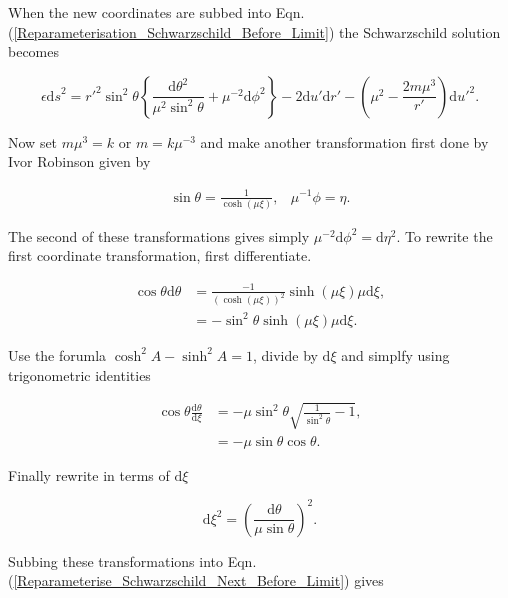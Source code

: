 \noindent When the new coordinates are subbed into Eqn.(\ref{Reparameterisation_Schwarzschild_Before_Limit}) the Schwarzschild solution becomes

\begin{equation}\label{Reparameterise_Schwarzschild_Next_Before_Limit}
\epsilon {\mathrm{d}s}^2 = {r'}^2 \sin^2 \theta \left\{ \frac{{\mathrm{d}\theta}^2}{\mu^2 \sin^2 \theta} +  \mu^{-2} {\mathrm{d} \phi}^2 \right\} - 2 {\mathrm{d}u'} {\mathrm{d}r'} - \left( \mu^2 - \frac{2 m \mu^3}{r'}\right) {\mathrm{d}u'}^2 . 
\end{equation}

\noindent Now set $m \mu^{3} = k$ or $ m = k \mu^{-3}$ and make another transformation first done by Ivor Robinson given by

\begin{align*} 
\sin{\theta} = \frac{1}{\cosh{(\mu \xi)}}, & \mu^{-1} \phi = \eta.  
\end{align*} 

\noindent The second of these transformations gives simply $\mu^{-2} \mathrm{d}\phi^2 = \mathrm{d} \eta^2$. To rewrite the first coordinate transformation, first differentiate.

\begin{align*} 
\cos{\theta} \mathrm{d} \theta & = \frac{-1}{(\cosh(\mu \xi))^{2}} \sinh(\mu \xi) \mu \mathrm{d} \xi, \\
                      & = -{\sin}^{2}\theta \sinh(\mu \xi) \mu \mathrm{d} \xi.
\end{align*}

\noindent Use the forumla $\cosh^2 A - \sinh^2 A = 1$, divide by $\mathrm{d} \xi$ and simplfy using trigonometric identities

\begin{align*}
\cos{\theta} \frac{\mathrm{d} \theta}{\mathrm{d} \xi} & = -\mu \sin^2 \theta \sqrt{\frac{1}{\sin^2 \theta} - 1}, \\
                                    & = - \mu \sin \theta \cos \theta.
\end{align*}

\noindent Finally rewrite in terms of $\mathrm{d} \xi$

\begin{equation*}
\mathrm{d} \xi^2 = {\left( \frac{\mathrm{d} \theta}{\mu \sin \theta}  \right)}^2.
\end{equation*}

\noindent Subbing these transformations into Eqn.(\ref{Reparameterise_Schwarzschild_Next_Before_Limit}) gives

